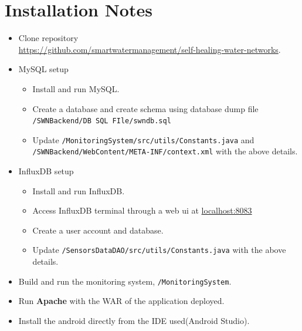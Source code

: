 \documentclass[11pt]{report} %
\begin{document}

\chapter{Installation Notes}
\begin{itemize}
\item Clone repository \\ \url {https://github.com/smartwatermanagement/self-healing-water-networks}.
\item MySQL setup
\begin{itemize}
\item Install and run MySQL. 
\item Create a database and create schema using database dump file  \texttt{/SWNBackend/DB SQL FIle/swndb.sql}
\item Update \texttt{/MonitoringSystem/src/utils/Constants.java} and \\ \texttt{/SWNBackend/WebContent/META-INF/context.xml} with the above details.
\end{itemize}
\item InfluxDB setup
\begin{itemize}
\item Install and run InfluxDB.
\item Access InfluxDB terminal through a web ui at \url {localhost:8083}
\item Create a user account and database.
\item Update \texttt{/SensorsDataDAO/src/utils/Constants.java} with the above details.
\end{itemize}
\item Build and run the monitoring system, \texttt{/MonitoringSystem}.
\item Run \textbf{Apache} with the WAR of the application deployed.
\item Install the android directly from the IDE used(Android Studio).
\end{itemize}
\end{document}
